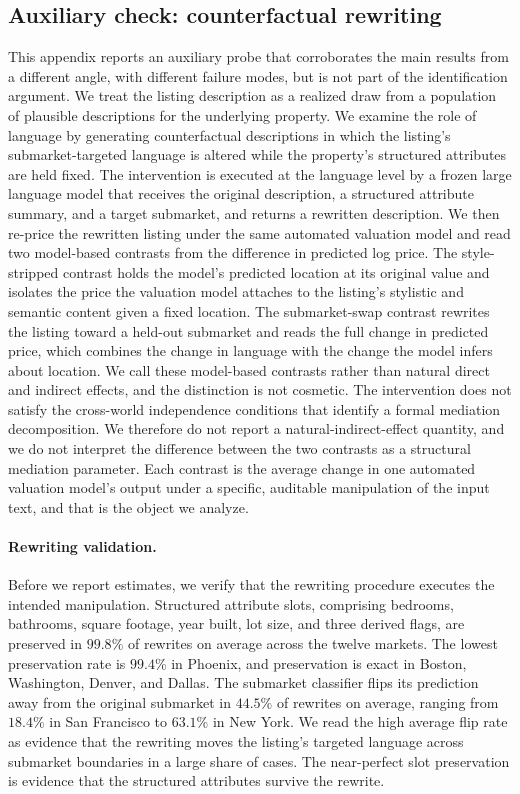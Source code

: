 
\subsection{Auxiliary check: counterfactual rewriting}
\label{sec:counterfactual-12}

This appendix reports an auxiliary probe that corroborates the main results from a
different angle, with different failure modes, but is not part of the
identification argument. We treat the listing description as a realized draw from a population of plausible descriptions for the underlying property. We examine the role of language by generating counterfactual descriptions in which the listing's submarket-targeted language is altered while the property's structured attributes are held fixed.
The intervention is executed at the language level by a frozen large language
model that receives the original description, a structured attribute summary, and
a target submarket, and returns a rewritten description. We then re-price the
rewritten listing under the same automated valuation model and read two
model-based contrasts from the difference in predicted log price. The
style-stripped contrast holds the model's predicted location at its original
value and isolates the price the valuation model attaches to the listing's
stylistic and semantic content given a fixed location. The submarket-swap
contrast rewrites the listing toward a held-out submarket and reads the full
change in predicted price, which combines the change in language with the change
the model infers about location. We call these model-based contrasts rather than
natural direct and indirect effects, and the distinction is not cosmetic. The intervention does not satisfy the cross-world independence conditions that identify a formal mediation decomposition. We therefore do not report a natural-indirect-effect quantity, and we do not interpret the difference between the two contrasts as a structural mediation parameter. Each contrast is the average change in one automated
valuation model's output under a specific, auditable manipulation of the input
text, and that is the object we analyze.

\paragraph{Rewriting validation.} Before we report estimates, we verify that the
rewriting procedure executes the intended manipulation. Structured attribute slots, comprising bedrooms, bathrooms, square footage, year built, lot size, and three derived flags, are preserved in $99.8\%$ of rewrites on average across the twelve markets. The lowest preservation rate is $99.4\%$ in Phoenix, and preservation is exact in Boston, Washington, Denver, and Dallas. The submarket
classifier flips its prediction away from the original submarket in $44.5\%$ of
rewrites on average, ranging from $18.4\%$ in San Francisco to $63.1\%$ in New
York. We read the high average flip rate as evidence that the rewriting moves the listing's targeted language across submarket boundaries in a large share of cases. The near-perfect slot preservation is evidence that the structured attributes survive the rewrite.

